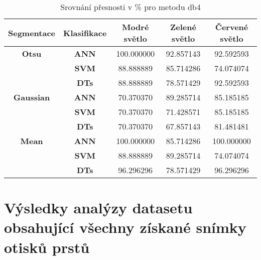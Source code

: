 \capstartfalse
\begin{table}[!htbp]
\centering
\begin{tabular}{|c|c|c|c|c|}
\hline
\textbf{Segmentace} & \textbf{Klasifikace} & \textbf{Modré světlo} & \textbf{Zelené světlo} & \textbf{Červené světlo} \\ \hline
\textbf{Otsu}       & \textbf{ANN}         & 100.000000            & 92.857143              & 92.592593               \\ \hline
\textbf{}           & \textbf{SVM}         & 88.888889             & 85.714286              & 74.074074               \\ \hline
\textbf{}           & \textbf{DTs}         & 88.888889             & 78.571429              & 92.592593               \\ \hline
\textbf{Gaussian}   & \textbf{ANN}         & 70.370370             & 89.285714              & 85.185185               \\ \hline
\textbf{}           & \textbf{SVM}         & 70.370370             & 71.428571              & 85.185185               \\ \hline
\textbf{}           & \textbf{DTs}         & 70.370370             & 67.857143              & 81.481481               \\ \hline
\textbf{Mean}       & \textbf{ANN}         & 100.000000            & 85.714286              & 100.000000              \\ \hline
\textbf{}           & \textbf{SVM}         & 88.888889             & 89.285714              & 74.074074               \\ \hline
\textbf{}           & \textbf{DTs}         & 96.296296             & 78.571429              & 96.296296               \\ \hline
\end{tabular}
\caption{Srovnání přesnosti v \% pro metodu db4 }
\end{table}
\capstarttrue






\chapter{Výsledky analýzy datasetu obsahující všechny získané snímky otisků prstů}

